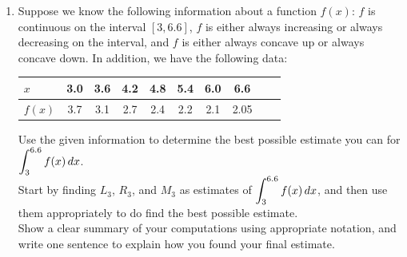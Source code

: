 \documentclass[11 pt]{article}
\newcommand{\ds}{\ensuremath{\displaystyle}}
\begin{document}
\begin{enumerate}

\item[5.] Suppose we know the following information about a function $f(x)$: $f$ is continuous on the interval $[3,6.6]$, $f$ is either always increasing or always decreasing on the interval, and $f$ is either always concave up or always concave down.  In addition, we have the following data:

	\begin{center}
		\begin{tabular}{l|ccccccccc}
		$x$  & 3.0 & 3.6 & 4.2 & 4.8 & 5.4 & 6.0 & 6.6 \\
		\hline 
		$f(x)$ & 3.7 & 3.1 & 2.7 & 2.4 & 2.2 & 2.1 & 2.05
		\end{tabular}
	\end{center}

Use the given information to determine the best possible estimate you can for $\ds \int_3^{6.6} f(x) \, dx$. \\  
Start by finding $L_3$, $R_3$, and $M_3$ as estimates of $\ds \int_3^{6.6} f(x) \, dx$, and then use them appropriately to do find the best possible estimate.  \\  

Show a clear summary of your computations using appropriate notation, and write one sentence to explain how you found your final estimate.
	
\end{enumerate}
\end{document}
